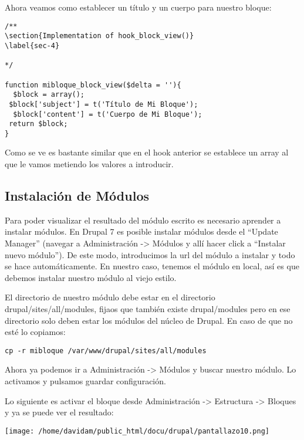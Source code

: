 \documentclass[11pt]{article}
\begin{document}
Ahora veamos como establecer un título y un cuerpo para nuestro bloque:


\begin{verbatim}
/** 
\section{Implementation of hook_block_view()}
\label{sec-4}

*/ 

function mibloque_block_view($delta = ''){ 
  $block = array(); 
 $block['subject'] = t('Título de Mi Bloque'); 
  $block['content'] = t('Cuerpo de Mi Bloque'); 
 return $block; 
}
\end{verbatim}



Como se ve es bastante similar que en el hook anterior se establece un
array al que le vamos metiendo los valores a introducir.

\subsection{Instalación de Módulos}
\label{sec-4.1}


Para poder visualizar el resultado del módulo escrito es necesario
aprender a instalar módulos. En Drupal 7 es posible instalar módulos
desde el ``Update Manager'' (navegar a Administración -> Módulos y allí
hacer click a ``Instalar nuevo módulo''). De este modo, introducimos la
url del módulo a instalar y todo se hace automáticamente. En nuestro
caso, tenemos el módulo en local, así es que debemos instalar nuestro
módulo al viejo estilo.

El directorio de nuestro módulo debe estar en el directorio
drupal/sites/all/modules, fijaos que también existe drupal/modules
pero en ese directorio solo deben estar los módulos del núcleo de
Drupal. En caso de que no esté lo copiamos:


\begin{verbatim}
cp -r mibloque /var/www/drupal/sites/all/modules
\end{verbatim}



Ahora ya podemos ir a Administración -> Módulos y buscar nuestro
módulo. Lo activamos y pulsamos guardar configuración.

Lo siguiente es activar el bloque desde Administración -> Estructura
-> Bloques y ya se puede ver el resultado:

\texttt{[image: /home/davidam/public\_html/docu/drupal/pantallazo10.png]}
\end{document}
